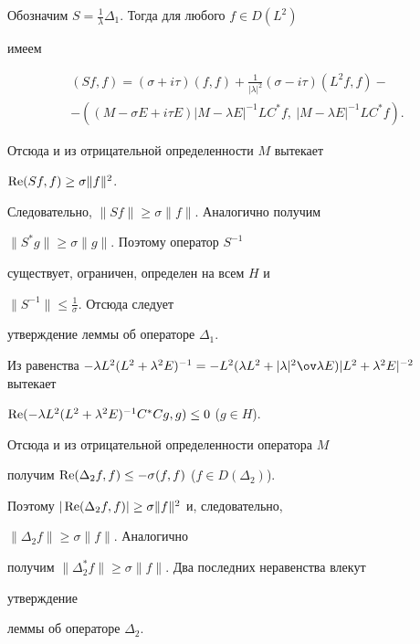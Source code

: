  


 


\begin{pf} 


Обозначим $S=\frac{1}{\lambda}\Delta_1$. Тогда для любого $f\in D(L^2)$ 


имеем 


\begin{multline*} 


(Sf,f)=(\sigma+i\tau)(f,f)+\frac{1}{|\lambda|^2} 


(\sigma-i\tau)(L^2f,f)- \\ 


-((M-\sigma E+i\tau E)|M-\lambda E|^{-1}LC^*f, 


\ |M-\lambda E|^{-1}LC^*f). 


\end{multline*} 


Отсюда и из отрицательной определенности $M$ вытекает 


$\operatorname{Re}(Sf,f)\ge\sigma\|f\|^2$. 


Следовательно, $\|Sf\|\ge\sigma\|f\|$. Аналогично получим 


$\|S^*g\|\ge\sigma\|g\|$. Поэтому оператор $S^{-1}$ 


существует, ограничен, определен на всем $H$ и 


$\|S^{-1}\|\le\frac{1}{\sigma}$. Отсюда следует 


утверждение леммы об операторе $\Delta_1$. 


 


Из равенства $-\lambda L^2(L^2+\lambda^2E)^{-1}= -L^2(\lambda 


L^2+|\lambda|^2\ov\lambda E)|L^2+\lambda^2E|^{-2}$ вытекает 


$\operatorname{Re}(-\lambda L^2(L^2+\lambda^2E)^{-1} C^*Cg,g)\le0$ ($g\in H$). 


Отсюда и из отрицательной определенности оператора $M$ 


получим $\operatorname{Re}(\Delta_2f,f)\le-\sigma(f,f)$ ($f\in D(\Delta_2)$). 


Поэтому $|\operatorname{Re}(\Delta_2f,f)|\ge \sigma\|f\|^2$ и, следовательно, 


$\|\Delta_2f\|\ge\sigma\|f\|$. Аналогично 


получим $\|\Delta^*_2f\|\ge\sigma\|f\|$. Два последних неравенства влекут 


утверждение 


леммы об операторе $\Delta_2$. 


\end{pf} 


